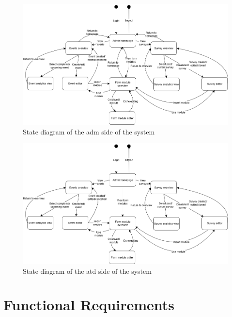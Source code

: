 \documentclass[12pt]{article}
\begin{document}
\begin{center}
\begin{figure}[H]
    \centering
    \includegraphics[width=1\linewidth]{images/state_diagram_admin.png}
    \caption{State diagram of the \gls{adm} side of the system}\label{fig:stateadmin}
\end{figure}
\end{center}

\begin{center}
\begin{figure}[H]
    \centering
    \includegraphics[width=1\linewidth]{images/state_diagram_attendee.png}
    \caption{State diagram of the \gls{atd} side of the system}\label{fig:stateattendee}
\end{figure}
\end{center}

\section{Functional Requirements}
\end{document}
